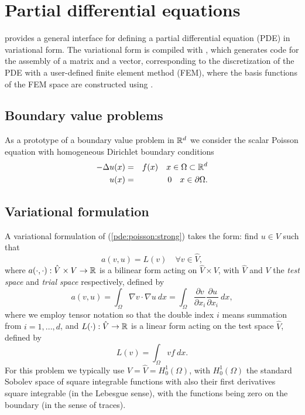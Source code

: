 \chapter{Partial differential equations}
\label{sec:pde}


\dolfin{} provides a general interface for defining a partial differential 
equation (PDE) in variational form. The variational form is compiled 
with \ffc{}, which generates code for the assembly of a matrix and a 
vector, corresponding to the discretization of the PDE with a user-defined  
finite element method (FEM), where the basis functions of the FEM space 
are constructed using \fiat{}. 

\section{Boundary value problems}

As a prototype of a boundary value problem in $\Bbb{R}^d$ we consider the 
scalar Poisson equation with homogeneous Dirichlet boundary conditions 
\begin{eqnarray}
-\Delta u(x)&=&f(x) \quad x\in \Omega \subset \Bbb{R}^d \label{pde:poisson:strong} \\
u(x)&=&0 \quad x\in \partial \Omega. \nonumber  
\end{eqnarray}

\section{Variational formulation}

A variational formulation of (\ref{pde:poisson:strong}) takes the form: 
find $u\in V$ such that  
\begin{equation}\label{pde:poisson:weak}
a(v,u)=L(v) \quad \forall v\in \hat V, 
\end{equation}
where $a(\cdot,\cdot):\hat V\times V\rightarrow \Bbb{R}$ is a bilinear form 
acting on $\hat V \times V$, with $\hat V$ and $V$ the {\em test space} and {\em trial space} 
respectively, defined by 
\begin{equation}
a(v,u)=\int_{\Omega} \nabla v \cdot \nabla u ~dx 
=\int_{\Omega} \frac{\partial v}{\partial x_i} \frac{\partial u}{\partial x_i} ~ dx,  
\end{equation}
where we employ tensor notation so that the double index $i$ means summation from $i=1,...,d$, 
and $L(\cdot):\hat V\rightarrow \Bbb{R}$ is a linear form acting on the test space $\hat V$,  
defined by 
\begin{equation}
L(v)=\int_{\Omega} v f ~dx.  
\end{equation}
For this problem we typically use $V=\hat V=H^1_0(\Omega)$, with $H^1_0(\Omega)$ 
the standard Sobolev space of square integrable functions with also their first 
derivatives square integrable (in the Lebesgue sense), 
with the functions being zero on the boundary (in the sense of traces).   


